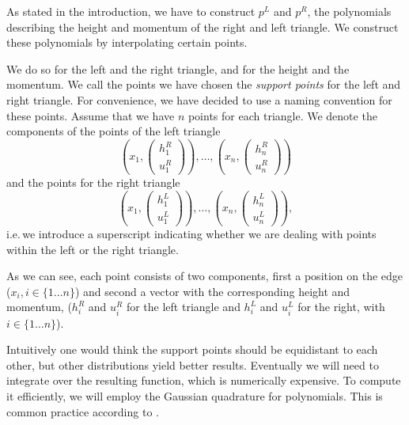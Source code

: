 \documentclass{article}
\begin{document}
As stated in the introduction, we have to construct $p^L$ and $p^R$, the polynomials describing the height and momentum of the right and left triangle. We construct these polynomials by interpolating certain points.

We do so for the left and the right triangle, and for the height and the momentum. We call the points we have chosen the \emph{support points} for the left and right triangle.
For convenience, we have decided to use a naming convention for these points.
Assume that we have $n$ points for each triangle.
We denote the components of the points of the left triangle
\begin{equation*}
\left(x_1,\begin{pmatrix}
    h_1^R \\ u_1^R
  \end{pmatrix}\right), \dots , \left(x_n, \begin{pmatrix}
    h_n^R \\ u_n^R
  \end{pmatrix}\right)
\end{equation*}
and the points for the right triangle
\begin{equation*}
\left(x_1,\begin{pmatrix}
    h_1^L \\ u_1^L
  \end{pmatrix}\right), \dots , \left(x_n,\begin{pmatrix}
    h_n^L \\ u_n^L
  \end{pmatrix}\right),
\end{equation*}
i.e.\,we introduce a superscript indicating whether we are dealing with points within the left or the right triangle.

As we can see, each point consists of two components, first a position on the edge ($x_i, i \in \{1 \dots n\}$) and second a vector with the corresponding height and momentum, ($h_i^R$ and $u_i^R$ for the left triangle and $h_i^L$ and $u_i^L$ for the right, with $i \in \{1 \dots n\}$).

Intuitively one would think the support points should be equidistant to each other, but other distributions yield better results.
Eventually we will need to integrate over the resulting function, which is numerically expensive. To compute it efficiently, we will employ the Gaussian quadrature for polynomials. This is common practice according to \cite{schwaiger08adaptive,castro07high-order-ader-fv-dg-numerical-methods,boeck08discontinuous-galerkin-verfahren}.
\end{document}
